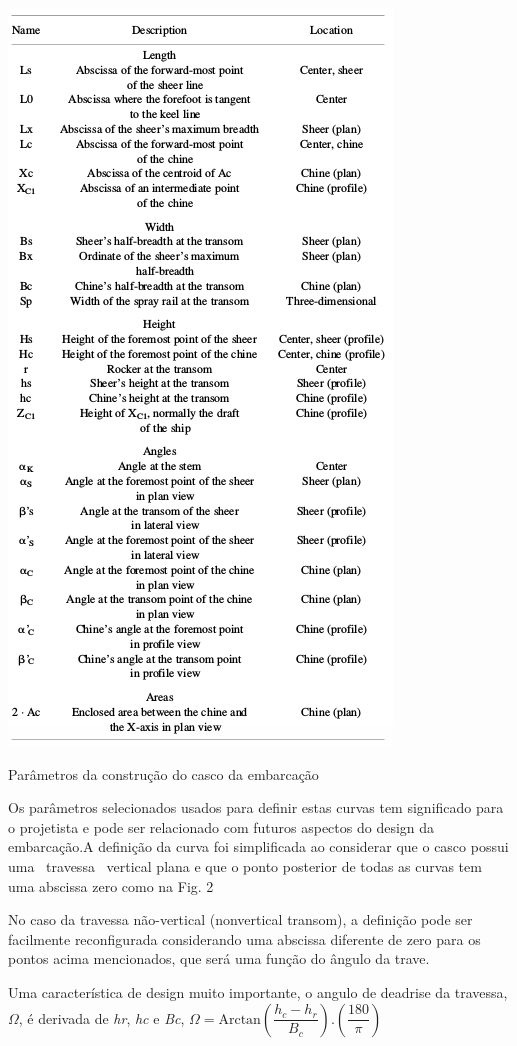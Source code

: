 \documentclass[]{article}
\begin{document}
\begin{table}[th]
	\centering
	\includegraphics[width=0.67\linewidth]{parametros}
	\caption{Parâmetros da construção do casco da embarcação}
	\label{fig:parametros}
\end{table}


Os parâmetros selecionados usados para definir estas curvas tem significado para o projetista e pode ser relacionado com futuros aspectos do design da embarcação.A definição da curva foi simplificada ao considerar que o casco possui uma ~travessa~ vertical plana e que o ponto posterior de todas as curvas tem uma abscissa zero como na Fig. 2

No caso da travessa não-vertical (nonvertical transom), a definição pode ser facilmente reconfigurada considerando uma abscissa diferente de zero para os pontos acima mencionados, que será uma função do ângulo da trave.

Uma característica de design muito importante, o angulo de deadrise da travessa, $\Omega$, é derivada de \textit{hr}, \textit{hc} e \textit{Bc}, $\Omega = \text{Arctan}\left(\dfrac{h_c - h_r}{B_c}\right).\left(\dfrac{180}{\pi}\right)$
\end{document}
